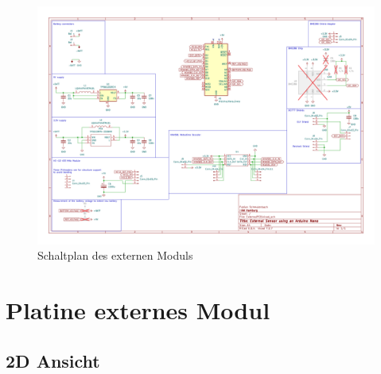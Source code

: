 \documentclass[a4paper,11pt]{article}
\begin{document}
\begin{figure}[H]
  \centering
  \includegraphics[scale=0.7, page=1, angle=90]{../pcbs/ExternalPCB/ExternalPCB.pdf}
  \caption{Schaltplan des externen Moduls}
  \label{pdf:schaltplanExtern}
\end{figure}

\clearpage
\section{Platine externes Modul}
\subsection{2D Ansicht}
\end{document}
